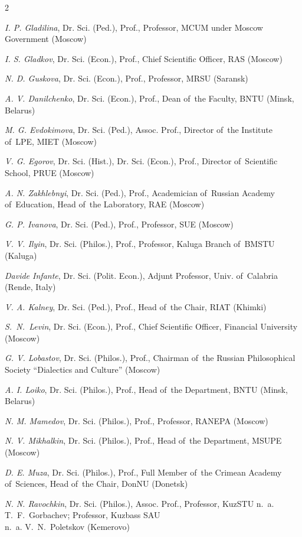 \begin{otherlanguage}{english}
\begin{multicols}{2}
\begin{flushleft}
\noindent \textit{I. P. Gladilina}, Dr. Sci. (Ped.), Prof., Professor, MCUM under Moscow Government (Moscow)

\noindent \textit{I. S. Gladkov}, Dr. Sci. (Econ.), Prof., Chief Scientific Officer, RAS (Moscow)

\noindent \textit{N. D. Guskova}, Dr. Sci. (Econ.), Prof., Professor, MRSU (Saransk)

\noindent \textit{A. V. Danilchenko}, Dr. Sci. (Econ.), Prof., Dean of the Faculty, BNTU (Minsk, Belarus)

\noindent \textit{M. G. Evdokimova}, Dr. Sci. (Ped.), Assoc. Prof., Director of the Institute of LPE, MIET (Moscow)

\noindent \textit{V. G. Egorov}, Dr. Sci. (Hist.), Dr. Sci. (Econ.), Prof., Director of Scientific School, PRUE (Moscow)

\noindent \textit{A. N. Zakhlebnyi}, Dr. Sci. (Ped.), Prof., Academician of Russian Academy of Education, Head of the Laboratory, RAE (Moscow)

\noindent \textit{G. P. Ivanova}, Dr. Sci. (Ped.), Prof., Professor, SUE (Moscow)

\noindent \textit{V. V. Ilyin}, Dr. Sci. (Philos.), Prof., Professor, Kaluga Branch of BMSTU (Kaluga)

\noindent \textit{Davide Infante}, Dr. Sci. (Polit. Econ.), Adjunt Professor, Univ. of Calabria (Rende, Italy)

\noindent \textit{V. A. Kalney}, Dr. Sci. (Ped.), Prof., Head of the Chair, RIAT (Khimki)

\noindent \textit{S. N. Levin}, Dr. Sci. (Econ.), Prof., Chief Scientific Officer, Financial University (Moscow)

\noindent \textit{G. V. Lobastov}, Dr. Sci. (Philos.), Prof., Chairman of the Russian Philosophical Society “Dialectics and Culture” (Moscow)

\noindent \textit{A. I. Loiko}, Dr. Sci. (Philos.), Prof., Head of the Department, BNTU (Minsk, Belarus)

\noindent \textit{N. M. Mamedov}, Dr. Sci. (Philos.), Prof., Professor, RANEPA (Moscow)

\noindent \textit{N. V. Mikhalkin}, Dr. Sci. (Philos.), Prof., Head of the Department, MSUPE (Moscow)

\noindent \textit{D. E. Muza}, Dr. Sci. (Philos.), Prof., Full Member of the Crimean Academy of Sciences, Head of the Chair, DonNU (Donetsk)

\noindent \textit{N. N. Ravochkin}, Dr. Sci. (Philos.), Assoc. Prof., Professor, KuzSTU n. a. T. F. Gorbachev; Professor, Kuzbass SAU\\ n. a. V. N. Poletskov (Kemerovo)


\end{flushleft}
\end{multicols}
\end{otherlanguage}
